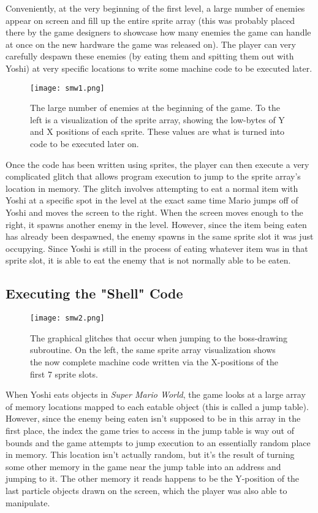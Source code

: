 Conveniently, at the very beginning of the first level, a large number of enemies appear on screen and fill up the entire sprite array (this was probably placed there by the game designers to showcase how many enemies the game can handle at once on the new hardware the game was released on). The player can very carefully despawn these enemies (by eating them and spitting them out with Yoshi) at very specific locations to write some machine code to be executed later.

\begin{figure}
\texttt{[image: smw1.png]}
\caption{The large number of enemies at the beginning of the game. To the left is a visualization of the sprite array, showing the low-bytes of Y and X positions of each sprite. These values are what is turned into code to be executed later on. \cite{dotsarecool_2015}}
\end{figure}

Once the code has been written using sprites, the player can then execute a very complicated glitch that allows program execution to jump to the sprite array's location in memory. The glitch involves attempting to eat a normal item with Yoshi at a specific spot in the level at the exact same time Mario jumps off of Yoshi and moves the screen to the right. When the screen moves enough to the right, it spawns another enemy in the level. However, since the item being eaten has already been despawned, the enemy spawns in the same sprite slot it was just occupying. Since Yoshi is still in the process of eating whatever item was in that sprite slot, it is able to eat the enemy that is not normally able to be eaten.

\subsection{Executing the "Shell" Code}

\begin{figure}
\texttt{[image: smw2.png]}
\caption{The graphical glitches that occur when jumping to the boss-drawing subroutine. On the left, the same sprite array visualization shows the now complete machine code written via the X-positions of the first 7 sprite slots. \cite{dotsarecool_2015}}
\end{figure}

When Yoshi eats objects in \textit{Super Mario World}, the game looks at a large array of memory locations mapped to each eatable object (this is called a jump table). However, since the enemy being eaten isn't supposed to be in this array in the first place, the index the game tries to access in the jump table is way out of bounds and the game attempts to jump execution to an essentially random place in memory. This location isn't actually random, but it's the result of turning some other memory in the game near the jump table into an address and jumping to it. The other memory it reads happens to be the Y-position of the last particle objects drawn on the screen, which the player was also able to manipulate.

